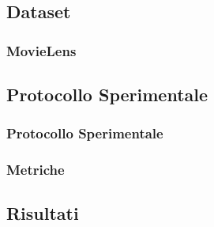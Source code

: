\documentclass{beamer}
\begin{document}
\subsection{Dataset}


\begin{frame}
\frametitle{MovieLens}
\end{frame}


\subsection{Protocollo Sperimentale}


\begin{frame}
\frametitle{Protocollo Sperimentale}
\end{frame}


\begin{frame}
\frametitle{Metriche}
\end{frame}


\subsection{Risultati}

\end{document}
